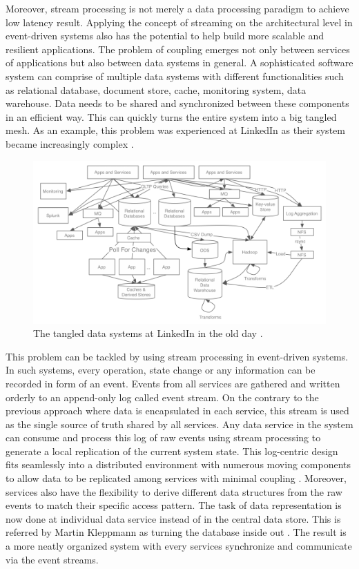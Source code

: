 Moreover, stream processing is not merely a data processing paradigm to achieve low latency result. Applying the concept of streaming on the architectural level in event-driven systems also has the potential to help build more scalable and resilient applications. The problem of coupling emerges not only between services of applications but also between data systems in general. A sophisticated software system can comprise of multiple data systems with different functionalities such as relational database, document store, cache, monitoring system, data warehouse. Data needs to be shared and synchronized between these components in an efficient way. This can quickly turns the entire system into a big tangled mesh. As an example, this problem was experienced at LinkedIn as their system became increasingly complex \cite{eventstreamingplatform}. 

\begin{figure}[h]
	\includegraphics[width=\linewidth]{images/linkedin-data-flow-ugly.png}
	\caption{The tangled data systems at LinkedIn in the old day \cite{eventstreamingplatform}.}
	\label{fig:tangledsystem}
\end{figure}

This problem can be tackled by using stream processing in event-driven systems. In such systems, every operation, state change or any information can be recorded in form of an event. Events from all services are gathered and written orderly to an append-only log called event stream. On the contrary to the previous approach where data is encapsulated in each service, this stream is used as the single source of truth shared by all services. Any data service in the system can consume and process this log of raw events using stream processing to generate a local replication of the current system state. This log-centric design fits seamlessly into a distributed environment with numerous moving components to allow data to be replicated among services with minimal coupling \cite{logjaykreps}. Moreover, services also have the flexibility to derive different data structures from the raw events to match their specific access pattern. The task of data representation is now done at individual data service instead of in the central data store. This is referred by Martin Kleppmann as turning the database inside out \cite{kleppmann2016making}. The result is a more neatly organized system with every services synchronize and communicate via the event streams.


